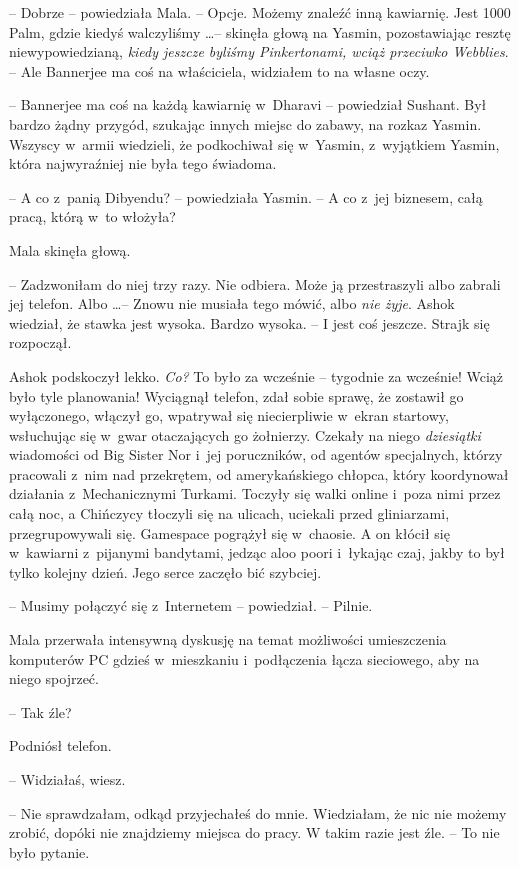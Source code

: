 \documentclass[oneside,polish,11pt,rmheadings]{mwbk}
\begin{document}
-- Dobrze -- powiedziała Mala. -- Opcje. Możemy znaleźć inną kawiarnię. Jest 1000 Palm, gdzie kiedyś walczyliśmy \ldots  -- skinęła głową na Yasmin, pozostawiając resztę niewypowiedzianą, \textit{kiedy jeszcze byliśmy Pinkertonami, wciąż przeciwko Webblies}. -- Ale Bannerjee ma coś na właściciela, widziałem to na własne oczy.

-- Bannerjee ma coś na każdą kawiarnię w~Dharavi -- powiedział Sushant. Był bardzo żądny przygód, szukając innych miejsc do zabawy, na rozkaz Yasmin. Wszyscy w~armii wiedzieli, że podkochiwał się w~Yasmin, z~wyjątkiem Yasmin, która najwyraźniej nie była tego świadoma.

-- A co z~panią Dibyendu? -- powiedziała Yasmin. -- A co z~jej biznesem, całą pracą, którą w~to włożyła?

Mala skinęła głową. 

-- Zadzwoniłam do niej trzy razy. Nie odbiera. Może ją przestraszyli albo zabrali jej telefon. Albo \ldots  -- Znowu nie musiała tego mówić, albo \textit{nie żyje}. Ashok wiedział, że stawka jest wysoka. Bardzo wysoka. -- I jest coś jeszcze. Strajk się rozpoczął. 

Ashok podskoczył lekko. \textit{Co?} To było za wcześnie -- tygodnie za wcześnie! Wciąż było tyle planowania! Wyciągnął telefon, zdał sobie sprawę, że zostawił go wyłączonego, włączył go, wpatrywał się niecierpliwie w~ekran startowy, wsłuchując się w~gwar otaczających go żołnierzy. Czekały na niego \textit{dziesiątki }wiadomości od Big Sister Nor i~jej poruczników, od agentów specjalnych, którzy pracowali z~nim nad przekrętem, od amerykańskiego chłopca, który koordynował działania z~Mechanicznymi Turkami. Toczyły się walki online i~poza nimi przez całą noc, a Chińczycy tłoczyli się na ulicach, uciekali przed gliniarzami, przegrupowywali się. Gamespace pogrążył się w~chaosie. A on kłócił się w~kawiarni z~pijanymi bandytami, jedząc aloo poori i~łykając czaj, jakby to był tylko kolejny dzień. Jego serce zaczęło bić szybciej.

-- Musimy połączyć się z~Internetem -- powiedział. -- Pilnie.

Mala przerwała intensywną dyskusję na temat możliwości umieszczenia komputerów PC gdzieś w~mieszkaniu i~podłączenia łącza sieciowego, aby na niego spojrzeć. 

-- Tak źle?

Podniósł telefon. 

-- Widziałaś, wiesz. 

-- Nie sprawdzałam, odkąd przyjechałeś do mnie. Wiedziałam, że nic nie możemy zrobić, dopóki nie znajdziemy miejsca do pracy. W takim razie jest źle. -- To nie było pytanie.
\end{document}
